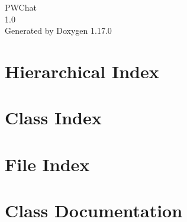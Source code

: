 \documentclass[twoside]{book}
\newcommand{\+}{\discretionary{\mbox{\scriptsize$\hookleftarrow$}}{}{}}
\newcommand{\clearemptydoublepage}{%
    \newpage{\pagestyle{empty}\cleardoublepage}%
  }
\begin{document}
  \raggedbottom
    \hypersetup{pageanchor=false,
                bookmarksnumbered=true,
                pdfencoding=unicode
               }
  \begin{titlepage}
  \vspace*{7cm}
  \begin{center}%
  {\Large PWChat}\\
  [1ex]\large 1.\+0 \\
  \vspace*{1cm}
  {\large Generated by Doxygen 1.17.0}\\
  \end{center}
  \end{titlepage}
  \clearemptydoublepage
  \tableofcontents
  \clearemptydoublepage
  \hypersetup{pageanchor=true}
\chapter{Hierarchical Index}

\chapter{Class Index}

\chapter{File Index}

\chapter{Class Documentation}















































\end{document}
